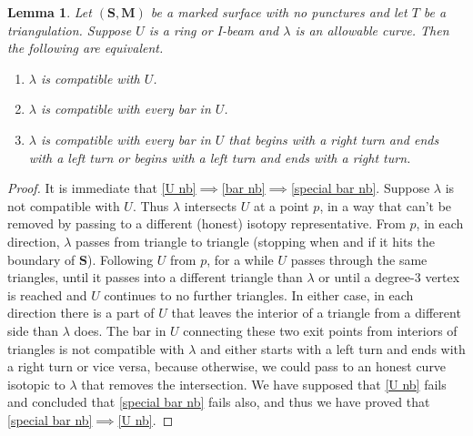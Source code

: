 \documentclass{amsart}
\newtheorem{lemma}[proposition]{Lemma}
\theoremstyle{definition}
\theoremstyle{remark}
\numberwithin{equation}{section}
\newcommand{\0}{{\mathbf{0}}}
\newcommand{\M}{\mathbf{M}}
\renewcommand{\S}{\mathbf{S}}
\begin{document}
\begin{lemma}\label{nb bars no punct}  
Let $(\S,\M)$ be a marked surface \emph{with no punctures} and let $T$ be a triangulation.
Suppose $U$ is a ring or I-beam and $\lambda$ is an allowable curve.
Then the following are equivalent.
\begin{enumerate}[\quad\rm(i)]
\item \label{U nb}
$\lambda$ is compatible with $U$.
\item \label{bar nb}
$\lambda$ is compatible with every bar in $U$.
\item \label{special bar nb}
$\lambda$ is compatible with every bar in $U$ that begins with a right turn and ends with a left turn or begins with a left turn and ends with a right turn.
\end{enumerate}
\end{lemma}
\begin{proof}
It is immediate that \eqref{U nb}$\implies$\eqref{bar nb}$\implies$\eqref{special bar nb}.
Suppose $\lambda$ is not compatible with $U$.
Thus $\lambda$ intersects $U$ at a point $p$, in a way that can't be removed by passing to a different (honest) isotopy representative.
From $p$, in each direction, $\lambda$ passes from triangle to triangle (stopping when and if it hits the boundary of $\S$).
Following $U$ from $p$, for a while $U$ passes through the same triangles, until it passes into a different triangle than $\lambda$ or until a degree-$3$ vertex is reached and $U$ continues to no further triangles.
In either case, in each direction there is a part of $U$ that leaves the interior of a triangle from a different side than $\lambda$ does.
The bar in $U$ connecting these two exit points from interiors of triangles is not compatible with $\lambda$ and either starts with a left turn and ends with a right turn or vice versa, because otherwise, we could pass to an honest curve isotopic to $\lambda$ that removes the intersection.
We have supposed that \eqref{U nb} fails and concluded that \eqref{special bar nb} fails also, and thus we have proved that \eqref{special bar nb}$\implies$\eqref{U nb}.
\end{proof}
\end{document}
